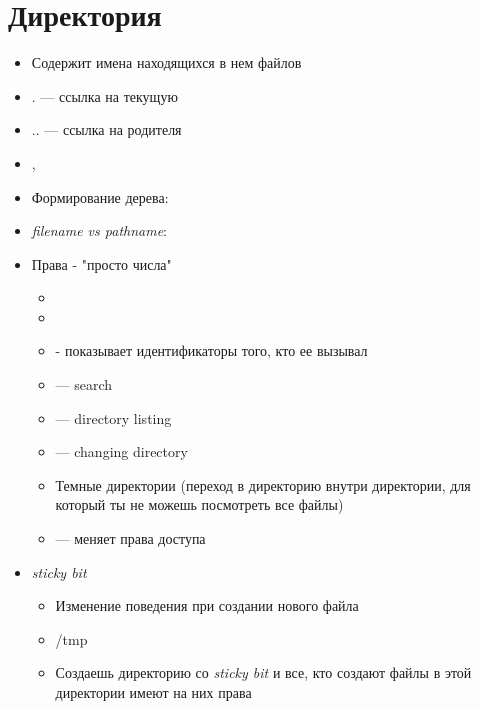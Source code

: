 \documentclass[../lectures.tex]{subfiles}
\begin{document}
\section{Директория}
\begin{itemize}
    \item Содержит имена находящихся в нем файлов
    \item $.$ --- ссылка на текущую
    \item $..$ --- ссылка на родителя
    \item {}, 
    \item Формирование дерева: 
    \item \emph{filename vs pathname}: 
    \item Права - "просто числа"
    \begin{itemize}
        \item {}
        \item {}
        \item {} - показывает идентификаторы того, кто ее вызывал
        \item {} --- search
        \item {} --- directory listing
        \item {} --- changing directory
        \item Темные директории (переход в директорию внутри директории, для который ты не можешь посмотреть все файлы)
        \item {} --- меняет права доступа
    \end{itemize}
    \item \emph{sticky bit}
    \begin{itemize}
        \item Изменение поведения при создании нового файла
        \item /tmp
        \item Создаешь директорию со \emph{sticky bit} и все, кто создают файлы в этой директории имеют на них права
    \end{itemize}
\end{itemize}
\end{document}
